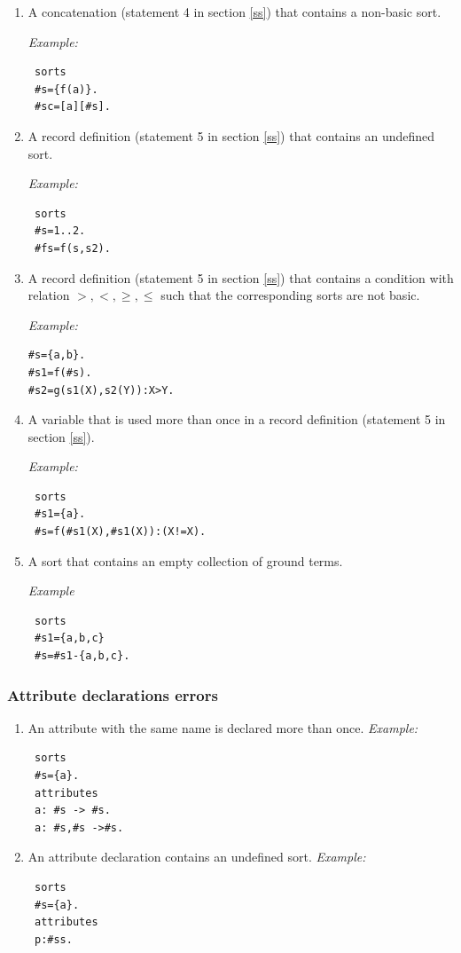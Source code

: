 \documentclass[12pt, letterpaper]{article}
\begin{document}
\begin{enumerate}
\item A concatenation (statement  4 in section \ref{ss}) that contains a non-basic sort.

\textit{Example:}
\begin{verbatim}
 sorts
 #s={f(a)}.
 #sc=[a][#s].
\end{verbatim}



\item A record definition (statement 5 in section \ref{ss}) that contains an undefined sort.

\textit{Example:}
\begin{verbatim}
 sorts
 #s=1..2.
 #fs=f(s,s2).
\end{verbatim}



\item A record definition  (statement 5 in section \ref{ss}) that contains a condition with relation $>,<,\geq,\leq$ such that the
   corresponding sorts are not basic.

\textit{Example:}
\begin{verbatim}
#s={a,b}.
#s1=f(#s). 
#s2=g(s1(X),s2(Y)):X>Y.
\end{verbatim}

\item  A variable that is used more than once in a record definition (statement  5 in section \ref{ss}).

\textit{Example:}

\begin{verbatim}
 sorts
 #s1={a}.
 #s=f(#s1(X),#s1(X)):(X!=X).
\end{verbatim}
\item A sort that contains an empty collection of ground terms.

\textit{Example}
\begin{verbatim}
 sorts
 #s1={a,b,c}
 #s=#s1-{a,b,c}.
\end{verbatim}
\end{enumerate}
\subsubsection{Attribute declarations errors}

\begin{enumerate}
\item An attribute with the same name is declared more than once.
\textit{Example:}
\begin{verbatim}
 sorts
 #s={a}.
 attributes
 a: #s -> #s.
 a: #s,#s ->#s.
\end{verbatim}
\item An attribute declaration contains an undefined sort.
\textit{Example:}
\begin{verbatim}
 sorts
 #s={a}.
 attributes
 p:#ss.
\end{verbatim}
\end{enumerate}
\end{document}
